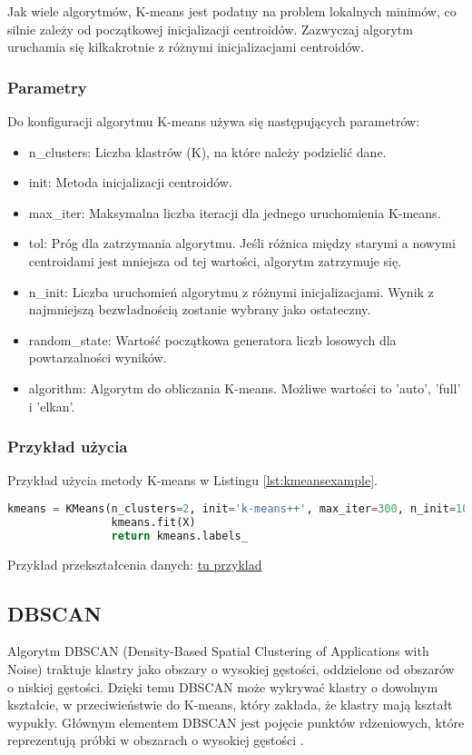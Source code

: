 			Jak wiele algorytmów, K-means jest podatny na problem lokalnych minimów, co silnie zależy od początkowej inicjalizacji centroidów. Zazwyczaj algorytm uruchamia się kilkakrotnie z różnymi inicjalizacjami centroidów.


			
		\subsubsection{Parametry}
			Do konfiguracji algorytmu K-means używa się następujących parametrów:
			\begin{itemize}
				\item n\_clusters: Liczba klastrów (K), na które należy podzielić dane.
				\item init: Metoda inicjalizacji centroidów.
				\item max\_iter: Maksymalna liczba iteracji dla jednego uruchomienia K-means.
				\item tol: Próg dla zatrzymania algorytmu. Jeśli różnica między starymi a nowymi centroidami jest mniejsza od tej wartości, algorytm zatrzymuje się.
				\item n\_init: Liczba uruchomień algorytmu z różnymi inicjalizacjami. Wynik z najmniejszą bezwładnością zostanie wybrany jako ostateczny.
				\item random\_state: Wartość początkowa generatora liczb losowych dla powtarzalności wyników.
				\item algorithm: Algorytm do obliczania K-means. Możliwe wartości to 'auto', 'full' i 'elkan'.
			\end{itemize}
			
		\subsubsection{Przykład użycia}
			
			 Przykład użycia metody K-means w Listingu \ref{lst:kmeansexample}.
		
			\begin{lstlisting}[language=Python, caption={Przykład użycia algorytmu K-Means}, label={lst:kmeansexample}]
				kmeans = KMeans(n_clusters=2, init='k-means++', max_iter=300, n_init=10, random_state=0)
				kmeans.fit(X)
				return kmeans.labels_
			\end{lstlisting}
			
			
			Przykład przekształcenia danych:
			\underline{tu przyklad}

	  
	\subsection{DBSCAN}
		Algorytm DBSCAN (Density-Based Spatial Clustering of Applications with Noise) traktuje klastry jako obszary o wysokiej gęstości, oddzielone od obszarów o niskiej gęstości. Dzięki temu DBSCAN może wykrywać klastry o dowolnym kształcie, w przeciwieństwie do K-means, który zakłada, że klastry mają kształt wypukły. Głównym elementem DBSCAN jest pojęcie punktów rdzeniowych, które reprezentują próbki w obszarach o wysokiej gęstości \cite{dbscan}.


